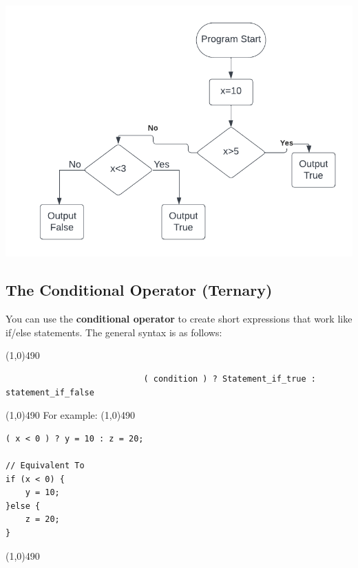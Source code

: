 \documentclass{report}
\begin{document}
    \begin{minipage}[]{0.3\textwidth}
        \begin{center}
            \includegraphics[scale=0.5]{./figures/flowchart3.png}
        \end{center} 
    \end{minipage}


    \bigbreak \noindent 
    \subsection{The Conditional Operator (Ternary)} 
    \bigbreak \noindent 
    \begin{concept}
 You can use the \textbf{conditional operator} to create short expressions that work like if/else statements. The general syntax is as follows:
	\end{concept}
    \smallbreak \noindent
    \line(1,0){490}
    \begin{verbatim}
                            ( condition ) ? Statement_if_true :  statement_if_false
    \end{verbatim}
    \line(1,0){490}
    \bigbreak \noindent 
    For example:
    \smallbreak \noindent
    \line(1,0){490}
    \begin{verbatim}
( x < 0 ) ? y = 10 : z = 20;  

// Equivalent To
if (x < 0) {
    y = 10;
}else {
    z = 20;
}
    \end{verbatim}
    \line(1,0){490}

    \pagebreak \bigbreak \noindent 
\end{document}
